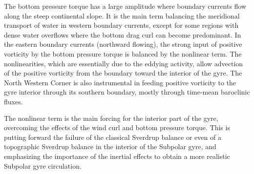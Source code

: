 \documentclass{ametsoc}
\begin{document}
The bottom pressure torque has a large amplitude where boundary currents flow along the steep continental slope. It is the main term  balancing the meridional transport of water in western  boundary currents, except for some regions with dense water overflows where the bottom drag curl can become predominant. In the eastern boundary currents (northward flowing), the strong input of positive vorticity by the bottom pressure torque is balanced by the nonlinear term. The nonlinearities, which are essentially due to the eddying activity, allow advection of the positive vorticity from the boundary toward the interior of the gyre. The North Western Corner is also instrumental in feeding positive vorticity to the gyre interior through its southern boundary, mostly through time-mean baroclinic fluxes.

The nonlinear term is the main forcing for the interior part of the gyre, overcoming the effects of the wind curl and bottom pressure torque. This is putting forward the failure of the classical Sverdrup balance or even of a topographic Sverdrup balance in the interior of the Subpolar gyre, and emphasizing the importance of the inertial effects to obtain a more realistic Subpolar gyre circulation.




%


%



\end{document}
